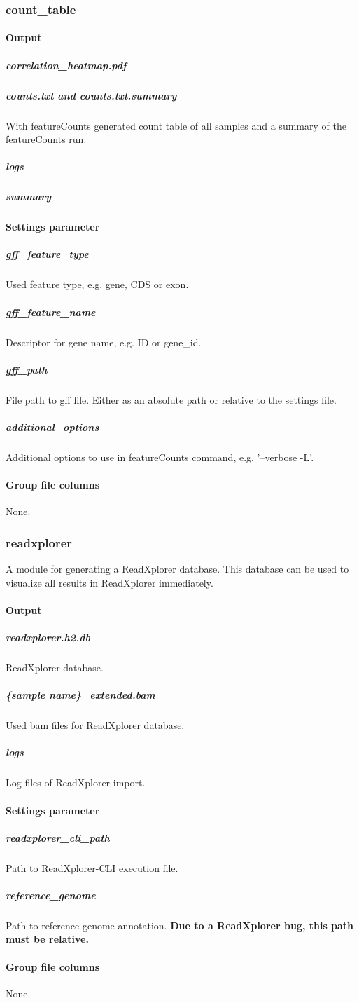 \documentclass[a4paper]{article}
\begin{document}
\subsubsection{count\_table}
\paragraph{Output} 
\subparagraph{correlation\_heatmap.pdf}
\subparagraph{counts.txt and counts.txt.summary}
With featureCounts generated count table of all samples and a summary of the featureCounts run.
\subparagraph{logs}
\subparagraph{summary}
\paragraph{Settings parameter}
\subparagraph{gff\_feature\_type}
Used feature type, e.g. gene, CDS or exon.
\subparagraph{gff\_feature\_name}
Descriptor for gene name, e.g. ID or gene\_id.
\subparagraph{gff\_path}
File path to gff file. Either as an absolute path or relative to the settings file.
\subparagraph{additional\_options}
Additional options to use in featureCounts command, e.g. '--verbose -L'. 
\paragraph{Group file columns} None.
\subsubsection{readxplorer}
A module for generating a ReadXplorer database. This database can be used to visualize all results in ReadXplorer immediately.
\paragraph{Output} 
\subparagraph{readxplorer.h2.db} ReadXplorer database.
\subparagraph{\{sample name\}\_extended.bam} Used bam files for ReadXplorer database.
\subparagraph{logs} Log files of ReadXplorer import.
\paragraph{Settings parameter}
\subparagraph{readxplorer\_cli\_path}
Path to ReadXplorer-CLI execution file.
\subparagraph{reference\_genome}
Path to reference genome annotation. \textbf{Due to a ReadXplorer bug, this path must be relative.}
\paragraph{Group file columns} None.
\end{document}
